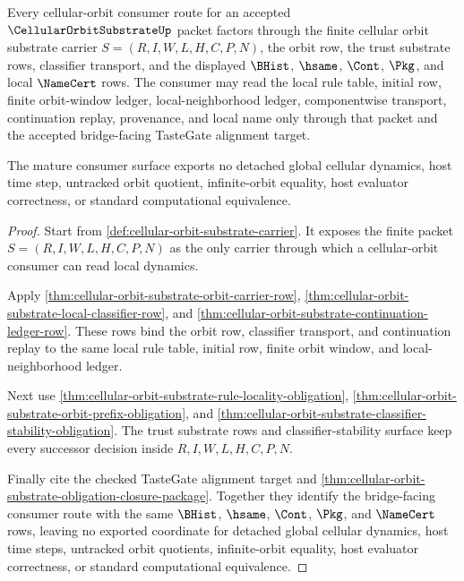 \begin{theorem}
\label{thm:cellular-orbit-substrate-mature-consumer-completeness}
Every cellular-orbit consumer route for an accepted $\CellularOrbitSubstrateUp$ packet factors through the finite cellular orbit substrate carrier $S=(R,I,W,L,H,C,P,N)$, the orbit row, the trust substrate rows, classifier transport, and the displayed $\BHist$, $\hsame$, $\Cont$, $\Pkg$, and local $\NameCert$ rows. The consumer may read the local rule table, initial row, finite orbit-window ledger, local-neighborhood ledger, componentwise transport, continuation replay, provenance, and local name only through that packet and the accepted bridge-facing TasteGate alignment target.

The mature consumer surface exports no detached global cellular dynamics, host time step, untracked orbit quotient, infinite-orbit equality, host evaluator correctness, or standard computational equivalence.
\end{theorem}
\begin{proof}
Start from \autoref{def:cellular-orbit-substrate-carrier}. It exposes the finite packet $S=(R,I,W,L,H,C,P,N)$ as the only carrier through which a cellular-orbit consumer can read local dynamics.

Apply \autoref{thm:cellular-orbit-substrate-orbit-carrier-row}, \autoref{thm:cellular-orbit-substrate-local-classifier-row}, and \autoref{thm:cellular-orbit-substrate-continuation-ledger-row}. These rows bind the orbit row, classifier transport, and continuation replay to the same local rule table, initial row, finite orbit window, and local-neighborhood ledger.

Next use \autoref{thm:cellular-orbit-substrate-rule-locality-obligation}, \autoref{thm:cellular-orbit-substrate-orbit-prefix-obligation}, and \autoref{thm:cellular-orbit-substrate-classifier-stability-obligation}. The trust substrate rows and classifier-stability surface keep every successor decision inside $R,I,W,L,H,C,P,N$.

Finally cite the checked TasteGate alignment target and \autoref{thm:cellular-orbit-substrate-obligation-closure-package}. Together they identify the bridge-facing consumer route with the same $\BHist$, $\hsame$, $\Cont$, $\Pkg$, and $\NameCert$ rows, leaving no exported coordinate for detached global cellular dynamics, host time steps, untracked orbit quotients, infinite-orbit equality, host evaluator correctness, or standard computational equivalence.
\end{proof}


